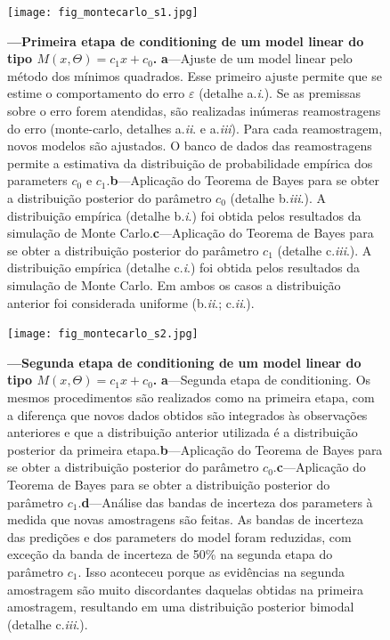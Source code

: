 \documentclass[./main.tex]{subfiles}
\begin{document}
\begin{figure}[t!] %
	\centering				
	\texttt{[image: fig\_montecarlo\_s1.jpg]}		
	\caption[Primeira etapa de \gls{conditioning} de um \gls{model} linear]
	{\textbf{---\;Primeira etapa de \gls{conditioning} de um \gls{model} linear do tipo $M(x, \Theta) = c_{1}x + c_{0}$.}
        \;\textbf{a}\;---\;Ajuste de um \gls{model} linear pelo método dos mínimos quadrados. Esse primeiro ajuste permite que se estime o comportamento do erro $\varepsilon$ (detalhe a.\textit{\textrm{i}}.). Se as premissas sobre o erro forem atendidas, são realizadas inúmeras reamostragens do erro (\gls{monte-carlo}, detalhes a.\textit{\textrm{ii}}. e a.\textit{\textrm{iii}}). Para cada reamostragem, novos modelos são ajustados. O banco de dados das reamostragens permite a estimativa da distribuição de probabilidade empírica dos \gls{parameters} $c_0$ e $c_1$.\;\textbf{b}\;---\;Aplicação do Teorema de Bayes para se obter a distribuição posterior do parâmetro $c_0$ (detalhe b.\textit{\textrm{iii}}.). A distribuição empírica (detalhe b.\textit{\textrm{i}}.) foi obtida pelos resultados da simulação de Monte Carlo.\;\textbf{c}\;---\;Aplicação do Teorema de Bayes para se obter a distribuição posterior do parâmetro $c_1$ (detalhe c.\textit{\textrm{iii}}.). A distribuição empírica (detalhe c.\textit{\textrm{i}}.) foi obtida pelos resultados da simulação de Monte Carlo. Em ambos os casos a distribuição anterior foi considerada uniforme (b.\textit{\textrm{ii}}.; c.\textit{\textrm{ii}}.).
	}
\label{fig:bayes_s1}  %
\end{figure}
\begin{figure}[t!] %
	\centering				
	\texttt{[image: fig\_montecarlo\_s2.jpg]}		
	\caption[Segunda etapa de \gls{conditioning} de um \gls{model} linear]
	{\textbf{---\;Segunda etapa de \gls{conditioning} de um \gls{model} linear do tipo $M(x, \Theta) = c_{1}x + c_{0}$.}
        \;\textbf{a}\;---\;Segunda etapa de \gls{conditioning}. Os mesmos procedimentos são realizados como na primeira etapa, com a diferença que novos dados obtidos são integrados às observações anteriores e que a distribuição anterior utilizada é a distribuição posterior da primeira etapa.\;\textbf{b}\;---\;Aplicação do Teorema de Bayes para se obter a distribuição posterior do parâmetro $c_0$.\;\textbf{c}\;---\;Aplicação do Teorema de Bayes para se obter a distribuição posterior do parâmetro $c_1$.\;\textbf{d}\;---\;Análise das bandas de incerteza dos \gls{parameters} à medida que novas amostragens são feitas. As bandas de incerteza das predições e dos \gls{parameters} do \gls{model} foram reduzidas, com exceção da banda de incerteza de 50\% na segunda etapa do parâmetro $c_1$. Isso aconteceu porque as evidências na segunda amostragem são muito discordantes daquelas obtidas na primeira amostragem, resultando em uma distribuição posterior bimodal (detalhe c.\textit{\textrm{iii}}.).
	}
\label{fig:bayes_s2}  %
\end{figure}
\end{document}

